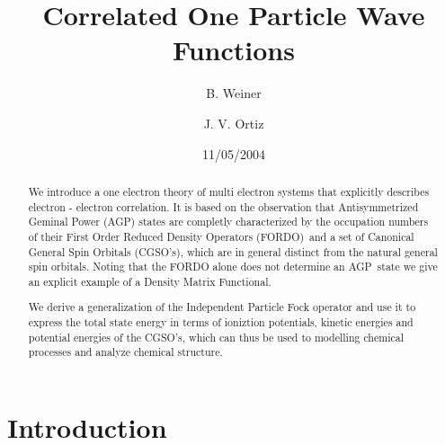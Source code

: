 \documentclass[aps,preprint]{revtex4}%
\begin{document}
\preprint{ }
\title{Correlated One Particle Wave Functions}
\author{B. Weiner}
\author{J. V. Ortiz}
\pacs{}

\begin{abstract}
We introduce a one electron theory of multi electron systems that explicitly
describes electron - electron correlation. It is based on the observation that
Antisymmetrized Geminal Power (AGP) states are completly characterized by the
occupation numbers of their First Order Reduced Density Operators (FORDO)\ and
a set of Canonical General Spin Orbitals (CGSO's), which are in general
distinct from the natural general spin orbitals. Noting that the FORDO alone
does not determine an AGP\ state we give an explicit example of a Density
Matrix Functional.

We derive a generalization of the Independent Particle Fock operator and use
it to express the total state energy in terms of ioniztion potentials, kinetic
energies and potential energies of the CGSO's, which can thus be used to
modelling chemical processes and analyze chemical structure.

\end{abstract}
\date{11/05/2004}
\maketitle
\tableofcontents


\section{Introduction \label{intro}}
\end{document}

